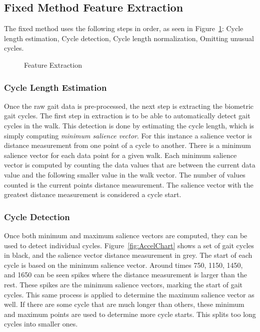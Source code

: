 \documentclass{sig-alternate}
\begin{document}
\subsection{Fixed Method Feature Extraction}
	The fixed method uses the following steps in order, as seen in Figure~\ref{fig:SecondStep}: Cycle length estimation, Cycle detection, Cycle length normalization, Omitting unusual cycles. 
	
\begin{figure}
\centering
{}
\caption{Feature Extraction}
\label{fig:SecondStep}
\end{figure}

\subsubsection{Cycle Length Estimation}
Once the raw gait data is pre-processed, the next step is extracting the biometric gait cycles. The first step in extraction is to be able to automatically detect gait cycles in the walk. This detection is done by estimating the cycle length, which is simply computing \textit{minimum salience vector}. For this instance a salience vector is distance measurement from one point of a cycle to another. There is a minimum salience vector for each data point for a given walk. Each minimum salience vector is computed by counting the data values that are between the current data value and the following smaller value in the walk vector. The number of values counted is the current points distance measurement. The salience vector with the greatest distance measurement is considered a cycle start. 
\subsubsection{Cycle Detection}
Once both minimum and maximum salience vectors are computed, they can be used to detect individual cycles. Figure~\ref{fig:AccelChart} shows a set of gait cycles in black, and the salience vector distance measurement in grey. The start of each cycle is based on the minimum salience vector. Around times 750, 1150, 1450, and 1650 can be seen spikes where the distance measurement is larger than the rest. These spikes are the minimum salience vectors, marking the start of gait cycles. This same process is applied to determine the maximum salience vector as well. If there are some cycle that are much longer than others, these minimum and maximum points are used to determine more cycle starts. This splits too long cycles into smaller ones.
\end{document}
